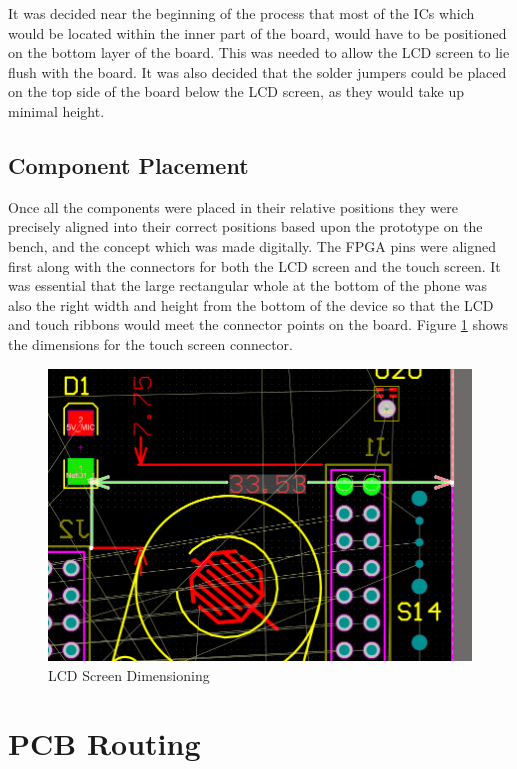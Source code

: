 	It was decided near the beginning of the process that most of the ICs which would be located within the inner part of the board, would have to be positioned on the bottom layer of the board. This was needed to allow the LCD screen to lie flush with the board. It was also decided that the solder jumpers could be placed on the top side of the board below the LCD screen, as they would take up minimal height.\\

\subsection{Component Placement}
	Once all the components were placed in their relative positions they were precisely aligned into their correct positions based upon the prototype on the bench, and the concept which was made digitally. The FPGA pins were aligned first along with the connectors for both the LCD screen and the touch screen. It was essential that the large rectangular whole at the bottom of the phone was also the right width and height from the bottom of the device so that the LCD and touch ribbons would meet the connector points on the board. Figure \ref{fig:component_placement} shows the dimensions for the touch screen connector. 

\begin{figure}
	\includegraphics[width=\linewidth]{Figures/component_placement.png}\centering
	\caption{LCD Screen Dimensioning}
	\label{fig:component_placement}
\end{figure}

\section{PCB Routing}

